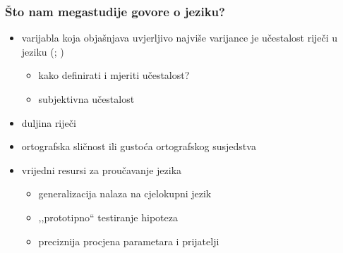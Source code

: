 \documentclass{beamer}
\newcommand{\tinycitep}[1]{%
    \bgroup
    \scriptsize
    \citep{#1}
    \egroup}
\begin{document}
\begin{frame}
    \frametitle{Što nam megastudije govore o jeziku?}

    \begin{itemize}
        \item varijabla koja objašnjava uvjerljivo najviše varijance je
            učestalost riječi u jeziku
            \bgroup
            \scriptsize
            (\citealp*{balotaVisualWordRecognition2006};
            \citealp[ch. 6]{harleyPsychologyLanguageData2014})
            \egroup
        \begin{itemize}
            \pause

            \item kako definirati i mjeriti učestalost?

            \pause

            \item subjektivna učestalost
        \end{itemize}

        \pause

        \item duljina riječi \tinycitep{ferrandMEGALEXMegastudyVisual2018,
            brysbaertImpactWordPrevalence2016}

        \pause

        \item ortografska sličnost ili gustoća ortografskog susjedstva
            \tinycitep{coltheartAccessInternalLexicon1977,
            yarkoniMovingColtheartNew2008}
    \end{itemize}
\end{frame}

\begin{frame}
    \begin{itemize}
        \item vrijedni resursi za proučavanje jezika

        \begin{itemize}
            \item generalizacija nalaza na cjelokupni jezik
                \tinycitep{yarkoniGeneralizabilityCrisis2019}

            \pause

            \item ,,prototipno`` testiranje hipoteza

            \pause

            \item preciznija procjena parametara i prijatelji
                \tinycitep{yarkoniChoosingPredictionExplanation2017,
                mengStatisticalParadisesParadoxes2018}
        \end{itemize}

    \end{itemize}
\end{frame}
\end{document}
